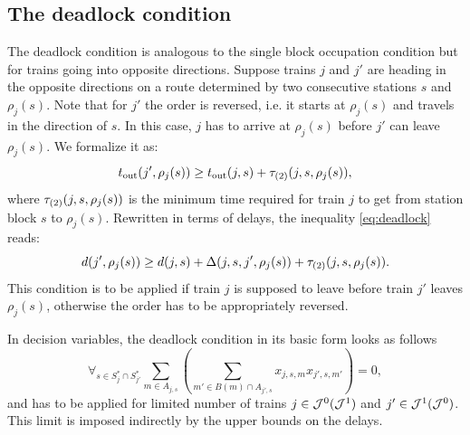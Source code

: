 \subsection{The deadlock condition}
The deadlock condition is analogous to the single block occupation condition
but for trains going into opposite directions. Suppose trains $j$ and $j'$ are
heading in the opposite directions on a route determined by two consecutive
stations $s$ and $\rho_j(s)$. Note that for $j'$ the order is reversed, i.e. it
starts at $\rho_j(s)$ and travels in the direction of $s$. In this case, $j$
has to arrive at $\rho_j(s)$ before $j'$ can leave $\rho_j(s)$. We formalize it
as:
\begin{equation}
  \label{eq:deadlock}
  t_\text{out}(j', \rho_j(s)) \ge t_\text{out}(j,s) + \tau_{(2)}(j, s, \rho_j(s)),
\end{equation}
where $\tau_{(2)}(j, s, \rho_j(s))$ is the minimum time required for train $j$ to
get from station block $s$ to $\rho_{j}(s)$. Rewritten in terms of delays, the
inequality \eqref{eq:deadlock} reads:
\begin{equation}
  \label{eq:deadlock2}
  d(j',\rho_j(s)) \ge d(j, s) + \Delta(j,s,j',\rho_j(s)) + \tau_{(2)}(j, s, \rho_j(s)).
\end{equation}
This condition is to be applied if train $j$ is supposed to leave before train
$j'$ leaves $\rho_{j}(s)$, otherwise the order has to be appropriately
reversed.

In decision variables, the deadlock condition in its basic form looks as
follows
\begin{equation}
  \label{eq:qubo:deadlock}
  \forall_{s \in S^{*}_{j} \cap S^{*}_{j'}} \sum_{m \in A_{j, s}} \left(
  \sum_{m' \in B(m) \cap A_{j', s}} x_{j,s,m}x_{j',s,m'}
  \right) = 0,
\end{equation}
and has to be applied for limited number of trains $j \in \mathcal{J}^{0} (\mathcal{J}^{1})$
and $j' \in \mathcal{J}^{1}(\mathcal{J}^{0})$. This limit is imposed indirectly by the upper
bounds on the delays.
